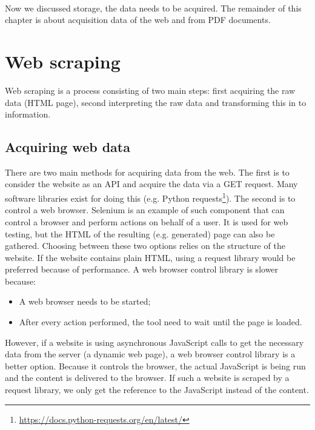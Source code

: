 \documentclass{ou-report}
\begin{document}
\ \\
Now we discussed storage, the data needs to be acquired. The remainder of this 
chapter is about acquisition data of the web and from PDF documents.

\section{Web scraping}
\label{sec:web_scraping}
Web scraping is a process consisting of two main steps: first acquiring the raw 
data (HTML page), second interpreting the raw data and transforming this in to 
information.

\subsection{Acquiring web data}
There are two main methods for acquiring data from the web. The first is to 
consider the website as an API and acquire the data via a GET request. Many 
software libraries exist for doing this (e.g. Python 
requests\footnote{\url{https://docs.python-requests.org/en/latest/}}).
The second is to control a web browser. Selenium is an example of such 
component that can control a browser and perform actions on behalf of a user. 
It is used for web testing, but the HTML of the resulting (e.g. generated) page 
can also be gathered. Choosing between these two options relies on the structure
of the website. If the website contains plain HTML, using a request library
would be preferred because of performance. A web browser control library is
slower because:
\begin{itemize}
    \item A web browser needs to be started;
    \item After every action performed, the tool need to wait until the page is
    loaded.
\end{itemize}

However, if a website is using asynchronous JavaScript calls to get the 
necessary data from the server (a dynamic web page), a web browser control 
library is a better option. Because it controls the browser, the actual 
JavaScript is being run and the content is delivered to the browser.
%
If such a website is scraped by a request library, we only get the reference 
to the JavaScript instead of the content.
\end{document}
